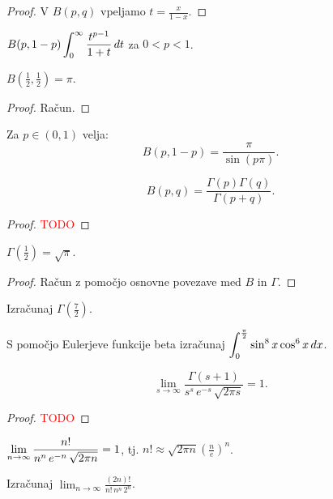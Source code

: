 \begin{proof}
    V \(B(p,q)\) vpeljamo \(t = \frac{x}{1-x}\).
\end{proof}

\begin{posledica}
    \(\displaystyle B(p, 1-p) \int_{0}^{\infty} \frac{t^{p-1}}{1+t} \, dt\) za \(0<p<1\).
\end{posledica}

\begin{posledica}
    \(B(\frac{1}{2}, \frac{1}{2}) = \pi\).
\end{posledica}

\begin{proof}
    Račun.
\end{proof}

\begin{opomba}
    Za \(p \in (0,1)\) velja: \[B(p, 1-p) = \frac{\pi}{\sin (p \pi)}.\]
\end{opomba}

\begin{izrek}
    \[B(p,q) = \frac{\Gamma(p) \Gamma(q)}{\Gamma(p+q)}.\]
\end{izrek}

\begin{proof}
    \textcolor{red}{TODO}
\end{proof}

\begin{posledica}
    \(\Gamma(\frac{1}{2}) = \sqrt{\pi}\).
\end{posledica}

\begin{proof}
    Račun z pomočjo osnovne povezave med \(B\) in \(\Gamma\).
\end{proof}

\begin{primer}
    Izračunaj \(\Gamma(\frac{7}{2})\).
\end{primer}

\begin{primer}
    S pomočjo Eulerjeve funkcije beta izračunaj \(\displaystyle \int_{0}^{\frac{\pi}{2}} \sin^8x \cos^6x \, dx\).
\end{primer}

\begin{izrek}
    \[\lim_{s \to \infty} \frac{\Gamma(s+1)}{s^s \, e^{-s} \, \sqrt{2 \pi s}} = 1.\]
\end{izrek}

\begin{proof}
    \textcolor{red}{TODO}
\end{proof}

\begin{posledica}
    \(\displaystyle \lim_{n \to \infty} \frac{n!}{n^n \, e ^{-n} \, \sqrt{2 \pi n}} = 1\), tj. \(n! \approx \sqrt{2 \pi n} (\frac{n}{e})^n\).
\end{posledica}

\begin{primer}
    Izračunaj \( \lim_{n \to \infty} \frac{(2n)!}{n! \, n^n \, 2^n}\).
\end{primer}